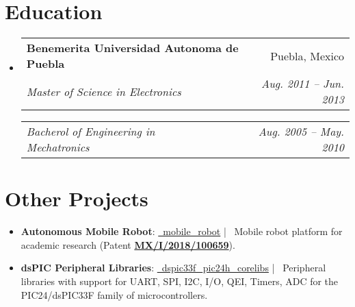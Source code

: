 \documentclass[letterpaper,11pt]{article}
\makeatletter
\newcommand{\resumeItem}[2]{
  \item\small{
    \textbf{#1}{: #2 \vspace{-2pt}}
  }
}
\newcommand{\resumeSubheading}[4]{
  \vspace{-1pt}\item
    \begin{tabular*}{0.97\textwidth}[t]{l@{\extracolsep{\fill}}r}
      \textbf{#1} & #2 \\
      \textit{\small#3} & \textit{\small #4} \\
    \end{tabular*}\vspace{-5pt}
}
\newcommand{\resumeSubSubheading}[2]{
    \begin{tabular*}{0.97\textwidth}{l@{\extracolsep{\fill}}r}
      \textit{\small#1} & \textit{\small #2} \\
    \end{tabular*}\vspace{-5pt}
}
\newcommand{\resumeSubItem}[2]{\resumeItem{#1}{#2}\vspace{-1pt}}
\newcommand{\resumeSubHeadingListStart}{\begin{itemize}[leftmargin=*]}
\newcommand{\resumeSubHeadingListEnd}{\end{itemize}\vspace{5pt}}
\def \Patent{https://drive.google.com/file/d/1DsnaAByaBixFv9GfyCH6JUAA95fj8aTY/view}
\makeatother
\begin{document}
\section{Education}
  \resumeSubHeadingListStart
    \resumeSubheading
      {Benemerita Universidad Autonoma de Puebla}{Puebla, Mexico}
      {Master of Science in Electronics}{Aug. 2011 -- Jun. 2013}
   \resumeSubSubheading
      {Bacherol of Engineering in Mechatronics}{Aug. 2005 -- May. 2010}
  \resumeSubHeadingListEnd


\section{Other Projects}
  \resumeSubHeadingListStart
    \resumeSubItem{Autonomous Mobile Robot}
      {\href{https://github.com/datgeezus/mobile_robot}{\faGithub \, mobile\_robot}
      | \, Mobile robot platform for academic research (Patent \textbf{\href{\Patent}{MX/I/2018/100659}}). }
    \resumeSubItem{dsPIC Peripheral Libraries}
      {\href{https://github.com/datgeezus/dspic33f_pic24h_corelibs}{\faGithub \, dspic33f\_pic24h\_corelibs} 
      | \,  Peripheral libraries with support for UART, SPI, I2C, I/O, QEI, Timers, ADC for the PIC24/dsPIC33F 
      family of microcontrollers.}
  \resumeSubHeadingListEnd


 
\end{document}
